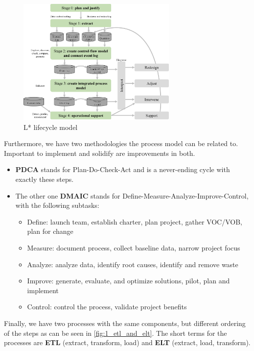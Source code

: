 \begin{figure}[H]
  \centering
  \includegraphics[width=0.7\textwidth]{assets/basics/l_star.png}
  \caption{L* lifecycle model}
  \label{fig:1_l_star}
\end{figure}

Furthermore, we have two methodologies the process model can be related to. Important to implement and solidify are improvements in both.
\begin{itemize}
  \item \textbf{PDCA} stands for Plan-Do-Check-Act and is a never-ending cycle with exactly these steps. 
  \item The other one \textbf{DMAIC} stands for Define-Measure-Analyze-Improve-Control, with the following subtasks:
  \begin{itemize}
    \item {\color{gray}\footnotesize Define: launch team, establish charter, plan project, gather VOC/VOB, plan for change}
    \item {\color{gray}\footnotesize Measure: document process, collect baseline data, narrow project focus}
    \item {\color{gray}\footnotesize Analyze: analyze data, identify root causes, identify and remove waste}
    \item {\color{gray}\footnotesize Improve: generate, evaluate, and optimize solutions, pilot, plan and implement}
    \item {\color{gray}\footnotesize Control: control the process, validate project benefits}
  \end{itemize}
\end{itemize}

Finally, we have two processes with the same components, but different ordering of the steps as can be seen in \ref{fig:1_etl_and_elt}. The short terms for the processes are \textbf{ETL} (extract, transform, load) and \textbf{ELT} (extract, load, transform).

